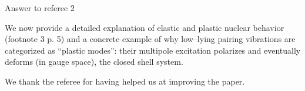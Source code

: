 \documentclass[a4paper,12pt]{book}
\begin{document}
\begin{flushleft}
Answer to referee 2
\end{flushleft}
We now provide a detailed explanation of elastic and plastic nuclear behavior (footnote 3 p. 5) and a concrete example of why low--lying pairing vibrations are categorized as ``plastic modes'': their multipole excitation polarizes and eventually deforms (in gauge space), the closed shell system.

We thank the referee for having helped us at improving the paper. 
\end{document}
